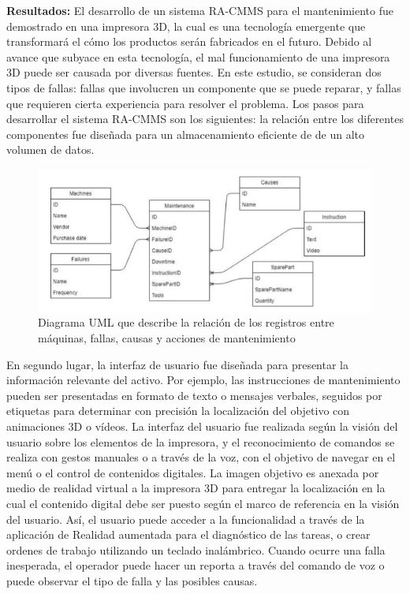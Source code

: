 \begin{description}
\item \textbf{Resultados:} El desarrollo de un sistema RA-CMMS para el mantenimiento fue demostrado en una impresora 3D, la cual es una tecnología emergente que transformará el cómo los productos serán fabricados en el futuro. Debido al avance que subyace en esta tecnología, el mal funcionamiento de una impresora 3D puede ser causada por diversas fuentes. En este estudio, se consideran dos tipos de fallas: fallas que involucren un componente que se puede reparar, y fallas que requieren cierta experiencia para resolver el problema. Los pasos para desarrollar el sistema RA-CMMS son los siguientes: la relación entre los diferentes componentes fue diseñada para un almacenamiento eficiente de de un alto volumen de datos.

\begin{figure}[H]
\centering
\includegraphics[scale=0.7]{images/umla.png}
\caption{Diagrama UML que describe la relación de los registros entre máquinas, fallas, causas y acciones de mantenimiento \parencite{aransyash2019}}
\end{figure}




En segundo lugar, la interfaz de usuario fue diseñada para presentar la información relevante del activo. Por ejemplo, las instrucciones de mantenimiento pueden ser presentadas en formato de texto o mensajes verbales, seguidos por etiquetas para determinar con precisión la localización del objetivo con animaciones 3D o vídeos. La interfaz del usuario fue realizada según la visión del usuario sobre los elementos de la impresora, y el reconocimiento de comandos se realiza con gestos manuales o a través de la voz, con el objetivo de navegar en el menú o el control de contenidos digitales. La imagen objetivo es anexada por medio de realidad virtual a la impresora 3D para entregar la localización en la cual el contenido digital debe ser puesto según el marco de referencia en la visión del usuario. Así, el usuario puede acceder a la funcionalidad a través de la aplicación de Realidad aumentada para el diagnóstico de las tareas, o crear ordenes de trabajo utilizando un teclado inalámbrico. Cuando ocurre una falla inesperada, el operador puede hacer un reporta a través del comando de voz o puede observar el tipo de falla y las posibles causas.


\end{description}
